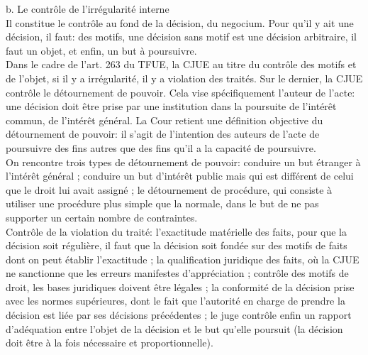 \documentclass[10pt, a4paper, openany]{book}
\begin{document}
b. Le contrôle de l'irrégularité interne \\
Il constitue le contrôle au fond de la décision, du negocium. Pour qu'il y ait une décision, il faut: des motifs, une décision sans motif est une décision arbitraire, il faut un objet, et enfin, un but à poursuivre. \\
Dans le cadre de l'art. 263 du TFUE, la CJUE au titre du contrôle des motifs et de l'objet, si il y a irrégularité, il y a violation des traités. Sur le dernier, la CJUE contrôle le détournement de pouvoir. Cela vise spécifiquement l'auteur de l'acte: une décision doit être prise par une institution dans la poursuite de l'intérêt commun, de l'intérêt général. La Cour retient une définition objective du détournement de pouvoir: il s'agit de l'intention des auteurs de l'acte de poursuivre des fins autres que des fins qu'il a la capacité de poursuivre. \\
On rencontre trois types de détournement de pouvoir: conduire un but étranger à l'intérêt général ; conduire un but d'intérêt public mais qui est différent de celui que le droit lui avait assigné ; le détournement de procédure, qui consiste à utiliser une procédure plus simple que la normale, dans le but de ne pas supporter un certain nombre de contraintes. \\
Contrôle de la violation du traité: l'exactitude matérielle des faits, pour que la décision soit régulière, il faut que la décision soit fondée sur des motifs de faits dont on peut établir l'exactitude ; la qualification juridique des faits, où la CJUE ne sanctionne que les erreurs manifestes d'appréciation ; contrôle des motifs de droit, les bases juridiques doivent être légales ; la conformité de la décision prise avec les normes supérieures, dont le fait que l'autorité en charge de prendre la décision est liée par ses décisions précédentes ; le juge contrôle enfin un rapport d'adéquation entre l'objet de la décision et le but qu'elle poursuit (la décision  doit être à la fois nécessaire et proportionnelle). 
\end{document}
